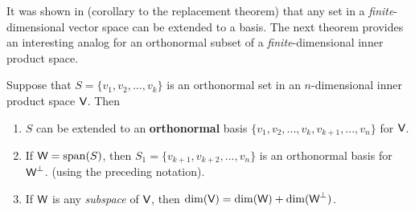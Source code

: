 \begin{remark} \label{remark 6.2.8}
It was shown in (corollary to the replacement theorem) that any \LID{} set in a \emph{finite}-dimensional vector space can be extended to a basis.
The next theorem provides an interesting analog for an orthonormal subset of a \emph{finite}-dimensional inner product space.
\end{remark}

\begin{theorem} \label{thm 6.7}
Suppose that \(S = \{ v_1, v_2, ..., v_k \}\) is an orthonormal set in an \(n\)-dimensional inner product space \(\textsf{V}\).
Then
\begin{enumerate}
\item \(S\) can be extended to an \textbf{orthonormal} basis \(\{ v_1, v_2, ..., v_k, v_{k+1}, ..., v_n \}\) for \(\textsf{V}\).
\item If \(\textsf{W} = \operatorname{span}(S)\), then \(S_1 = \{v_{k+1}, v_{k+2}, ..., v_n \}\) is an orthonormal basis for \(\textsf{W}^{\perp}\).
    (using the preceding notation).
\item If \(\textsf{W}\) is any \emph{subspace} of \(\textsf{V}\), then \(\dim(\textsf{V}) = \dim(\textsf{W}) + \dim(\textsf{W}^{\perp})\).
\end{enumerate}
\end{theorem}

